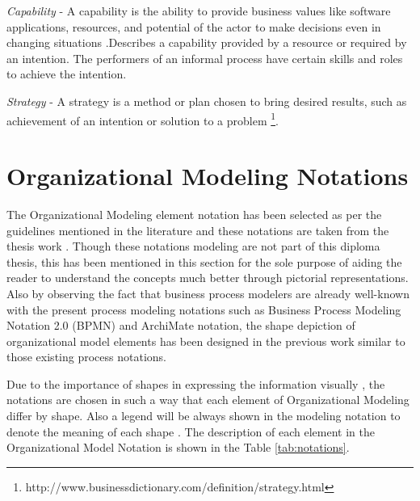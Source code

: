 \textit{Capability} - A capability is the ability to provide business values like software applications, resources, and potential of the actor to make decisions even in changing situations \cite{Stirna2012}.Describes a capability provided by a resource or required by an intention. The performers of an informal process have certain skills and roles to achieve the intention.   

\textit{Strategy} -  A  strategy is a method or plan chosen to bring  desired results, such as achievement of an intention or solution to a problem \footnote{http://www.businessdictionary.com/definition/strategy.html}. 

\section{Organizational Modeling Notations}
\label{sec:resourcecentricorganizationalmodeling}
The Organizational Modeling element notation has been selected as per the guidelines mentioned in the literature \cite{Moody2009} and these notations are taken from the thesis work \cite{Sierr2015}. Though these notations modeling are not part of this diploma thesis, this has been mentioned in this section for the sole purpose of aiding the reader to understand the concepts much better through pictorial representations. Also by observing  the fact that business process modelers are already well-known with the present process modeling notations such as Business Process Modeling Notation 2.0 (BPMN) \cite{bpm2011} and ArchiMate notation\cite{arc2013}, the shape depiction of organizational model elements has been designed in the previous work \cite{Sierr2015} similar to those existing process notations. 

Due to the importance of shapes in expressing the information visually , the notations are chosen in such a way that each element of Organizational Modeling  differ by shape. Also a legend will be always shown in the modeling notation to denote the meaning of each shape \cite{Moody2009}. The description of each element in the Organizational Model Notation is shown in the Table \ref{tab:notations}. 

